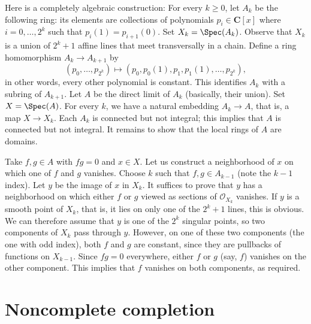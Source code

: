 \medskip\noindent
Here is a completely algebraic construction: For every $k \ge 0$, let $A_k$
be the following ring: its elements are collections of
polynomials $p_i \in \mathbf{C}[x]$ where $i = 0, \dots, 2^k$ such that
$p_i(1) = p_{i + 1}(0)$. Set $X_k = \Spec(A_k)$. Observe that $X_k$ is
a union of $2^k + 1$ affine lines that meet transversally in a chain.
Define a ring homomorphism $A_k \to A_{k + 1}$ by
$$
(p_0, \dots, p_{2^k})
\longmapsto
(p_0, p_0(1), p_1, p_1(1), \dots, p_{2^k}),
$$
in other words, every other polynomial is constant. This identifies
$A_k$ with a subring of $A_{k + 1}$. Let $A$ be the direct limit of $A_k$
(basically, their union). Set $X = \Spec(A)$. For every $k$, we have
a natural embedding $A_k \to A$, that is, a map $X\to X_k$.
Each $A_k$ is connected but not integral; this implies that $A$ is
connected but not integral. It remains to show that the local rings of
$A$ are domains.

\medskip\noindent
Take $f, g \in A$ with $fg = 0$ and $x \in X$. Let us construct a
neighborhood of $x$ on which one of $f$ and $g$ vanishes. Choose $k$
such that $f, g \in A_{k - 1}$ (note the $k - 1$ index).
Let $y$ be the image of $x$ in $X_k$. It suffices to prove that $y$ has
a neighborhood on which either $f$ or $g$ viewed as sections of
$\mathcal{O}_{X_k}$ vanishes.
If $y$ is a smooth point of $X_k$, that is, it lies on only one of the
$2^k + 1$ lines, this is obvious. We can therefore assume that $y$ is one
of the $2^k$ singular points, so two components of $X_k$ pass through
$y$. However, on one of these two components (the one with odd index),
both $f$ and $g$ are constant, since they are pullbacks of functions on
$X_{k - 1}$. Since $fg = 0$ everywhere, either $f$ or $g$ (say, $f$)
vanishes on the other component.
This implies that $f$ vanishes on both components, as required.






\section{Noncomplete completion}
\label{section-noncomplete-completion}

